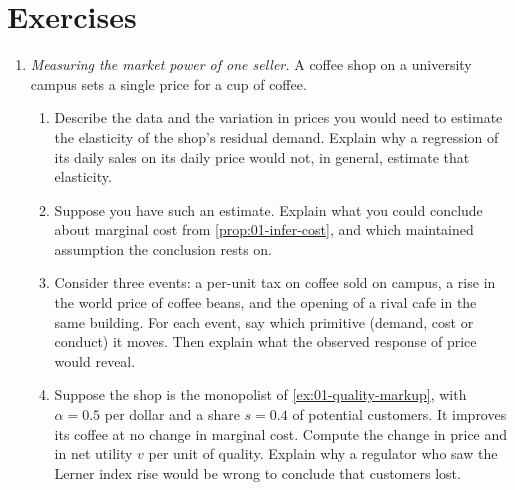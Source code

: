 \section{Exercises}\label{sec:01-exercises}

\begin{enumerate}[label=\arabic*., leftmargin=*, itemsep=6pt]

\item \textit{Measuring the market power of one seller.} A coffee shop on a university campus sets a single price
for a cup of coffee.
\begin{enumerate}[label=(\alph*)]
  \item Describe the data and the variation in prices you would need to estimate the elasticity of the shop's
  residual demand. Explain why a regression of its daily sales on its daily price would not, in general, estimate
  that elasticity.
  \item Suppose you have such an estimate. Explain what you could conclude about marginal cost from
  \cref{prop:01-infer-cost}, and which maintained assumption the conclusion rests on.
  \item Consider three events: a per-unit tax on coffee sold on campus, a rise in the world price of coffee beans,
  and the opening of a rival cafe in the same building. For each event, say which primitive (demand, cost or
  conduct) it moves. Then explain what the observed response of price would reveal.
  \item Suppose the shop is the monopolist of \cref{ex:01-quality-markup}, with $\alpha = 0.5$ per dollar and a
  share $s = 0.4$ of potential customers. It improves its coffee at no change in marginal cost. Compute the change
  in price and in net utility $v$ per unit of quality. Explain why a regulator who saw the Lerner index rise would
  be wrong to conclude that customers lost.
\end{enumerate}


\end{enumerate}
